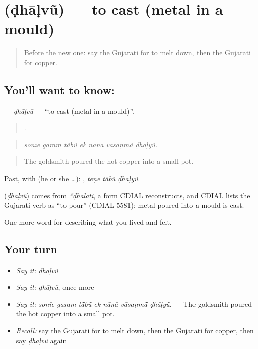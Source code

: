 \section[\texorpdfstring{\gu{ઢાળવું} (ḍhāḷvũ)}{ઢાળવું (ḍhāḷvũ)}]{ (ḍhāḷvũ) — to cast (metal in a mould)}

\label{lesson:GU-C510-dhaalvu}



\begin{quote}
Before the new one: say the Gujarati for to melt down, then the Gujarati for copper.
\end{quote}

\subsection*{You'll want to know: }
\textbf{} — \emph{ḍhāḷvũ} — \textquotedblleft{}to cast (metal in a mould)\textquotedblright{}.

\begin{quote}
      .
\end{quote}

\begin{quote}
\emph{sonīe garam tā̃bũ ek nānā vāsaṇmā̃ ḍhāḷyũ.}
\end{quote}

\begin{quote}
The goldsmith poured the hot copper into a small pot.
\end{quote}

Past, with  (he or she …):   , \emph{teṇe tā̃bũ ḍhāḷyũ}.

\begin{cousinweb}
\textbf{} (\emph{ḍhāḷvũ}) comes from \emph{*ḍhalati}, a form CDIAL reconstructs, and CDIAL lists the Gujarati verb as \textquotedblleft{}to pour\textquotedblright{} (CDIAL 5581): metal poured into a mould is cast.
\end{cousinweb}

\begin{grammarlens}[title={What you've built}]
One more word for describing what you lived and felt.
\end{grammarlens}

\subsection*{Your turn}
\begin{itemize}
\raggedright
  \item \emph{Say it:} \emph{ḍhāḷvũ}
  \item \emph{Say it:} \emph{ḍhāḷvũ}, once more
  \item \emph{Say it:} \emph{sonīe garam tā̃bũ ek nānā vāsaṇmā̃ ḍhāḷyũ.} — The goldsmith poured the hot copper into a small pot.
  \item \emph{Recall:} say the Gujarati for to melt down, then the Gujarati for copper, then say \emph{ḍhāḷvũ} again
\end{itemize}

